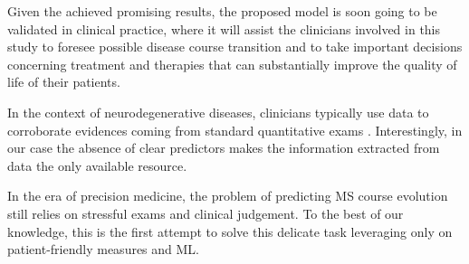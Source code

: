 Given the achieved promising results, the proposed model is soon going to be validated in clinical practice, where it will assist the clinicians involved in this study to foresee possible disease course transition and to take important decisions concerning treatment and therapies that can substantially improve the quality of life of their patients.

In the context of neurodegenerative diseases, clinicians typically use \PCOs data to corroborate evidences coming from standard quantitative exams \cite{black2013patient}. Interestingly, in our case the absence of clear \SP predictors makes the information extracted from \PCOs data the only available resource.

In the era of precision medicine, the problem of predicting MS course evolution still relies on stressful exams and clinical judgement.
To the best of our knowledge, this is the first attempt to solve this delicate task leveraging only on patient-friendly measures and ML.


